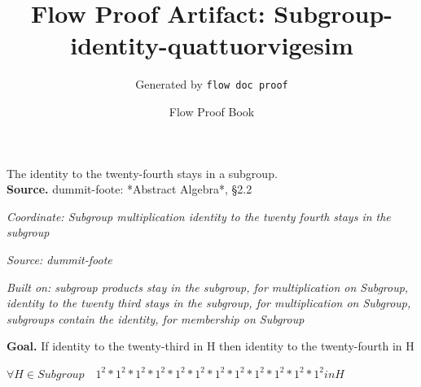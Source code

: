 \documentclass[11pt]{article}
\title{Flow Proof Artifact: Subgroup-identity-quattuorvigesim}
\author{Generated by \texttt{flow doc proof}}
\date{Flow Proof Book}
\theoremstyle{definition}
\begin{document}
\maketitle
The identity to the twenty-fourth stays in a subgroup.\\[0.5em]
\textbf{Source.} dummit-foote: *Abstract Algebra*, §2.2\\[0.5em]
\bigskip
{}\par
\smallskip\noindent\textit{Coordinate: Subgroup \cdot multiplication \cdot identity to the twenty fourth stays in the subgroup}\par
\smallskip\noindent\textit{Source: dummit-foote}\par
\smallskip\noindent\textit{Built on: subgroup products stay in the subgroup, for multiplication on Subgroup, identity to the twenty third stays in the subgroup, for multiplication on Subgroup, subgroups contain the identity, for membership on Subgroup}\par
\medskip
\noindent\textbf{Goal.} If identity to the twenty-third in H then identity to the twenty-fourth in H\par
\noindent$\displaystyle \forall H \in Subgroup\quad 1^{2} * 1^{2} * 1^{2} * 1^{2} * 1^{2} * 1^{2} * 1^{2} * 1^{2} * 1^{2} * 1^{2} * 1^{2} * 1^{2} in H$\par
\medskip
\noindent
\end{document}
